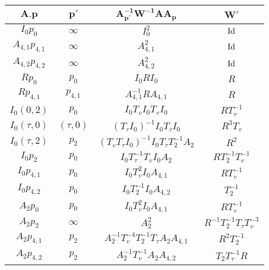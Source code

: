 \documentclass{article}[12pt]
\begin{document}
\begin{table}[h]\label{d=1table}
  \begin{center}
  {\renewcommand{\arraystretch}{1.2}%
\begin{tabular}{|c|c|c|c|}
\hline 
$\mathbf{A.p}$ & $\mathbf{p'}$ & $\mathbf{A_{p'}^{-1}W^{-1}A A_p}$ & $\mathbf{W'}$  \\
\hline

$I_0 p_0$ & $\infty$ & $I_0^2$ & ${\rm Id}$\\
\hline

$A_{4,1} p_{4,1}$ & $\infty$ & $A_{4,1}^2$ & ${\rm Id}$\\
\hline

$A_{4,2} p_{4,2}$ & $\infty$ & $A_{4,2}^2$ & ${\rm Id}$\\
\hline

$R p_0$ & $p_0$ & $I_0RI_0$ & $R$\\
\hline

$R p_{4,1}$ & $p_{4,1}$ & $A_{4,1}^{-1}RA_{4,1}$ & $R$\\
\hline

$I_0 (0,2)$ & $p_0$ & $I_0T_vI_0T_vI_0$& $RT_v^{-1}$\\
\hline

$I_0 (\tau,0)$ & $(\tau,0)$ & $(T_\tau I_0)^{-1}I_0T_\tau I_0$ & $R^3T_\tau$\\
\hline

$I_0 (\tau,2)$ & $p_2$ & $(T_vT_\tau I_0)^{-1}I_0T_\tau T_2^{-1}A_2$ & $R^2$\\
\hline

$I_0 p_2$ & $p_0$ & $I_0T_\tau ^{-1}T_vI_0A_2$ & $RT_2^{-1}T_v^{-1}$\\
\hline

$I_0 p_{4,1}$ & $p_0$ & $I_0T_v ^2I_0A_{4,1}$ & $RT_v^{-1}$\\
\hline

$I_0 p_{4,2}$ & $p_0$ & $I_0T_2^{-1}I_0A_{4,2}$ & $T_2^{-1}$\\

\hline
$A_2 p_0$ & $p_0$ & $I_0T_v ^2I_0A_{4,1}$ & $RT_v^{-1} $\\

\hline
$A_2 p_2$ & $\infty$ & $A_2^2$ & $R^{-1}T_2^{-1}T_\tau T_v^{-3}$\\

\hline
$A_2 p_{4,1}$ & $p_2$  & $A_2^{-1}T_v^{-4}T_2^{-1}T_\tau A_2A_{4,1}$ & $R^2T_2^{-1}$\\


\hline
$A_2 p_{4,2}$ & $p_2$ & $A_2^{-1}T_v ^{-1}A_2A_{4,2}$ & $T_2T_\tau ^{-1}R $\\


\end{tabular}}
\end{center}
\end{table}
\end{document}
